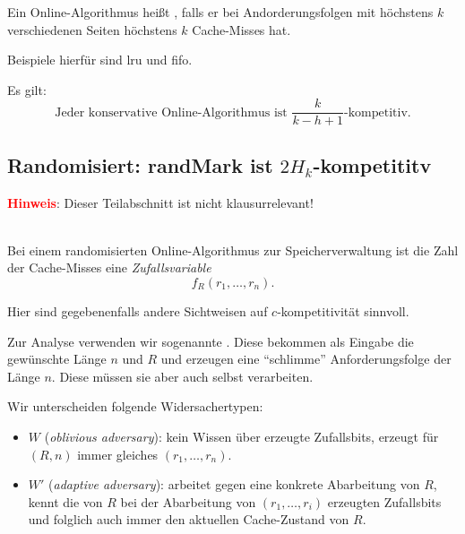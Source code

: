 \begin{definition}
  Ein Online-Algorithmus heißt , falls er bei Andorderungsfolgen mit höchstens \( k \) verschiedenen Seiten höchstens \( k \) Cache-Misses hat.

  Beispiele hierfür sind lru und fifo.
\end{definition}

Es gilt:
\begin{equation*}
  \text{Jeder konservative Online-Algorithmus ist } \frac{k}{k-h+1} \text{-kompetitiv.}
\end{equation*}

\subsection{Randomisiert: randMark ist \( 2H_k \)-kompetititv}

\textcolor{red}{\textbf{Hinweis}}: Dieser Teilabschnitt ist nicht klausurrelevant!

\ \\

Bei einem randomisierten Online-Algorithmus zur Speicherverwaltung ist die Zahl der Cache-Misses eine \emph{Zufallsvariable}
\begin{equation*}
  f_R(r_1,\dots,r_n)\text{.}
\end{equation*}

Hier sind gegebenenfalls andere Sichtweisen auf \( c \)-kompetitivität sinnvoll.

Zur Analyse verwenden wir sogenannte . Diese bekommen als Eingabe die gewünschte Länge \( n \) und \( R \) und erzeugen eine ``schlimme'' Anforderungsfolge der Länge \( n \). Diese müssen sie aber auch selbst verarbeiten.

Wir unterscheiden folgende Widersachertypen:

\begin{itemize}
  \item {} \( W \) (\emph{oblivious adversary}): kein Wissen über erzeugte Zufallsbits, erzeugt für \( (R,n) \) immer gleiches \( (r_1,\dots,r_n) \).
  \item {} \( W' \) (\emph{adaptive adversary}): arbeitet gegen eine konkrete Abarbeitung von \( R \), kennt die von \( R \) bei der Abarbeitung von \( (r_1,\dots,r_i) \) erzeugten Zufallsbits und folglich auch immer den aktuellen Cache-Zustand von \( R \).
\end{itemize}


